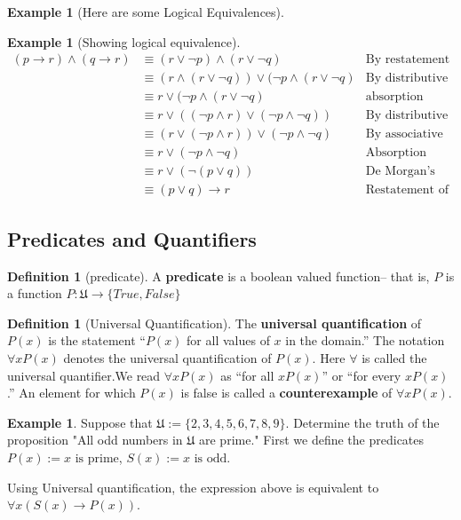 \documentclass[letterpaper,10pt]{article}
\theoremstyle{plain}
\theoremstyle{definition}
\newtheorem{defn}[thm]{Definition}
\newtheorem{exmp}[thm]{Example}
\theoremstyle{remark}
\providecommand{\land}{\ensuremath{\wedge}}
\providecommand{\lor}{\ensuremath{\vee}}
\begin{document}
\begin{exmp}[Here are some Logical Equivalences]
\begin{exmp}[Showing logical equivalence]
\begin{align*}
(p \to r) \land (q \to r) &\equiv (r \lor \lnot p) \land (r\lor \lnot q) &  \text{By restatement of implication as disjunction}\\
    &\equiv (r \land (r\lor \lnot q)) \lor (\lnot p \land  (r\lor \lnot q) & \text{By distributive law}\\
    &\equiv r \lor (\lnot p \land  (r\lor \lnot q) & \text{absorption}\\
    &\equiv r \lor ((\lnot p \land r) \lor ( \lnot p \land \lnot q)) & \text{By distributive law}\\
    &\equiv (r \lor (\lnot p \land r)) \lor ( \lnot p \land \lnot q) & \text{By associative}\\
    &\equiv r \lor ( \lnot p \land \lnot q) & \text{Absorption}\\
    &\equiv r \lor ( \lnot (p \lor q)) & \text{De Morgan's}\\
    & \equiv (p \lor q) \to r & \text{Restatement of implication}
\end{align*}
\end{exmp}

\newpage 
\subsection{Predicates and Quantifiers}

\begin{defn}[predicate]
A \textbf{predicate} is a boolean valued function-- that is, $P$ is a function $P: \mathfrak{U} \to \{True,False\}$
\end{defn}

\begin{defn}[Universal Quantification]
The \textbf{universal quantification} of $P(x)$ is the statement
“$P(x)$ for all values of $x$ in the domain.”
The notation $\forall x P(x)$ denotes the universal quantification of $P(x)$. Here $\forall$ is called the
universal quantifier.We read $\forall xP(x)$ as “for all $x P(x)$” or “for every  $xP(x)$.” An element
for which $P(x)$ is false is called a \textbf{counterexample} of $ \forall xP(x)$.
\end{defn}
\begin{exmp}

Suppose that $\mathfrak{U}:= \{2,3,4,5,6,7,8,9\}$.
Determine the truth of the proposition "All odd numbers in $\mathfrak{U}$ are prime." 
First we define the predicates
$P(x):=\text{$x$ is prime}$, 
$S(x):= \text{$x$ is odd}$.

Using Universal quantification, the expression above is equivalent to $\forall x (S(x)\to P(x))$.


\end{exmp}
\end{exmp}
\end{document}
